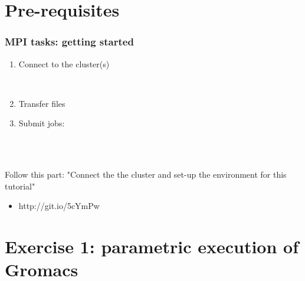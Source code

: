 \documentclass{beamer}
\begin{document}
\section{Pre-requisites}

\begin{frame}[fragile]
    \frametitle{MPI tasks: getting started}
    \begin{enumerate}
      \item Connect to the cluster(s)\\
        \begin{cmdline}
            \\
        \end{cmdline}

      \item Transfer files
        \begin{cmdline}
        \end{cmdline}

      \item  Submit jobs:
        \begin{cmdline}
            \\
            \\
        \end{cmdline}
	\end{enumerate}
	
    \begin{exampleblock}{Follow this part: "Connect the the cluster and set-up the environment for this tutorial"}
      \begin{itemize}
        \item http://git.io/5cYmPw
      \end{itemize}
    \end{exampleblock}	
	
\end{frame}





\section{Exercise 1: parametric execution of Gromacs}
\end{document}
